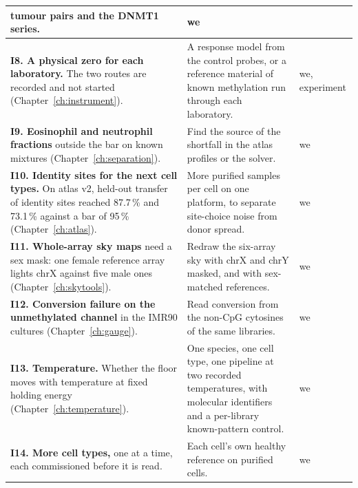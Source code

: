 {\begin{longtable}{@{}>{\raggedright\arraybackslash}p{}>{\raggedright\arraybackslash}p{}>{\raggedright\arraybackslash}p{}@{}}
 tumour pairs and the DNMT1 series. & we \\\cmidrule[0.2pt]{1-3}
\textbf{I8. A physical zero for each laboratory.} The two routes are recorded and not started (Chapter~\ref{ch:instrument}). & A response model from
 the control probes, or a reference material of known methylation run through each laboratory. & we, experiment \\\cmidrule[0.2pt]{1-3}
\textbf{I9. Eosinophil and neutrophil fractions} outside the bar on known mixtures (Chapter~\ref{ch:separation}). & Find the source of the shortfall
 in the atlas profiles or the solver. & we \\\cmidrule[0.2pt]{1-3}
\textbf{I10. Identity sites for the next cell types.} On atlas v2, held-out transfer of identity sites reached 87.7\,\% and 73.1\,\% against a bar of 95\,\% (Chapter~\ref{ch:atlas}). & More purified
 samples per cell on one platform, to separate site-choice noise from donor spread. & we \\\cmidrule[0.2pt]{1-3}
\textbf{I11. Whole-array sky maps} need a sex mask: one female reference array lights chrX against five male ones (Chapter~\ref{ch:skytools}). & Redraw the six-array sky with chrX and chrY masked, and with sex-matched references. & we \\\cmidrule[0.2pt]{1-3}
\textbf{I12. Conversion failure on the unmethylated channel} in the IMR90 cultures (Chapter~\ref{ch:gauge}). & Read conversion from the
 non-CpG cytosines of the same libraries. & we \\\cmidrule[0.2pt]{1-3}
\textbf{I13. Temperature.} Whether the floor moves with temperature at fixed holding energy (Chapter~\ref{ch:temperature}). & One species, one cell
 type, one pipeline at two recorded temperatures, with molecular identifiers and a per-library known-pattern control. & we \\\cmidrule[0.2pt]{1-3}
\textbf{I14. More cell types,} one at a time, each commissioned before it is read. & Each cell's own healthy reference on purified cells. & we \\
\bottomrule
\end{longtable}}

